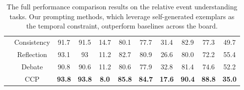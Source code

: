 \begin{table*}[ht]
{\begin{tabular}{c|c|ccc|ccc|ccc}
       & Consistency& 91.7                    & 91.5                    & 14.7                   & 80.1                    & 77.7                   & 31.4                    & 82.9                 & 77.3                 & 49.7                 \\
       & Reflection & 93.1                    & 93                      & 11.2                   & 82.7                    & 80.9                   & 26.6                    & 80.0                   & 72.2                 & 55.4                 \\
       & Debate     & 90.8                    & 90.6                    & 11.2                   & 80.6                    & 77.9                   & 32.8                    & 81.4                 & 74.6                 & 52.2                 \\
       & CCP        & \textbf{93.8}           & \textbf{93.8}          & \textbf{8.0}          & \textbf{85.8}           & \textbf{84.7}         & \textbf{17.6}              & \textbf{90.4}             & \textbf{88.8}          & \textbf{35.0}                 \\ \bottomrule
\end{tabular}
}
\caption{The full performance comparison results on the relative event understanding tasks. Our prompting methods, which leverage self-generated exemplars as the temporal constraint, outperform baselines across the board.}
\label{tab:main}
\vspace{-5mm}
\end{table*}